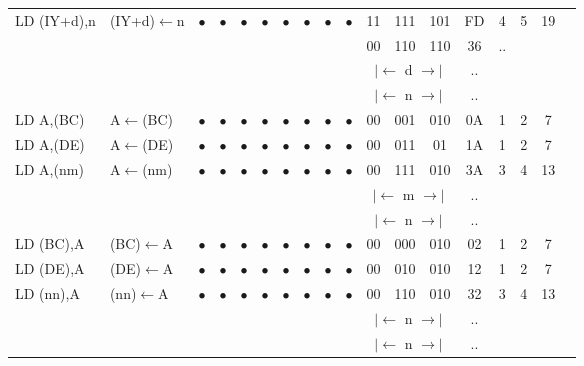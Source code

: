 \documentclass[oneside,a4paper]{book}
\newcommand{\instrt}{\rule{0pt}{2.7ex}}
\newcommand{\instrb}{\rule[-1.7ex]{0pt}{0pt}}
\begin{document}
{\begin{tabular}{llcccccccccccccccl}
		LD (IY+d),n\instrt & 
			(IY+d)$\leftarrow$n & 
			$\bullet$ & 
				$\bullet$ & 
				$\bullet$ & 
				$\bullet$ & 
				$\bullet$ & 
				$\bullet$ & 
				$\bullet$ & 
				$\bullet$ & 
			11 & 111 & 101 & 
			FD & 4 & 
			5 & 19 & \\
		\multicolumn{10}{c}{} & 00 & 110 & 110 & 36 & .. & & & \\
		\multicolumn{10}{c}{} & \multicolumn{3}{c}{$|\longleftarrow$ d $\longrightarrow|$} & .. & & & \\
		\multicolumn{10}{c}{} & \multicolumn{3}{c}{$|\longleftarrow$ n $\longrightarrow|$} & .. & & & \instrb \\

		LD A,(BC)\instrt & 
			A$\leftarrow$(BC) & 
			$\bullet$ & 
				$\bullet$ & 
				$\bullet$ & 
				$\bullet$ & 
				$\bullet$ & 
				$\bullet$ & 
				$\bullet$ & 
				$\bullet$ & 
			00 & 001 & 010 & 
			0A & 1 & 
			2 & 7 & \instrb \\

		LD A,(DE)\instrt & 
			A$\leftarrow$(DE) & 
			$\bullet$ & 
				$\bullet$ & 
				$\bullet$ & 
				$\bullet$ & 
				$\bullet$ & 
				$\bullet$ & 
				$\bullet$ & 
				$\bullet$ & 
			00 & 011 & 01 & 
			1A & 1 & 
			2 & 7 & \instrb \\

		LD A,(nm)\instrt & 
			A$\leftarrow$(nm) & 
			$\bullet$ & 
				$\bullet$ & 
				$\bullet$ & 
				$\bullet$ & 
				$\bullet$ & 
				$\bullet$ & 
				$\bullet$ & 
				$\bullet$ & 
			00 & 111 & 010 & 
			3A & 3 & 
			4 & 13 & \\
		\multicolumn{10}{c}{} & \multicolumn{3}{c}{$|\longleftarrow$ m $\longrightarrow|$} & .. & & & \\
		\multicolumn{10}{c}{} & \multicolumn{3}{c}{$|\longleftarrow$ n $\longrightarrow|$} & .. & & & \instrb \\
		
		LD (BC),A\instrt & 
			(BC)$\leftarrow$A & 
			$\bullet$ & 
				$\bullet$ & 
				$\bullet$ & 
				$\bullet$ & 
				$\bullet$ &
				$\bullet$ & 
				$\bullet$ & 
				$\bullet$ & 
			00 & 000 & 010 & 
			02 & 1 & 
			2 & 7 & \instrb \\

		LD (DE),A\instrt & 
			(DE)$\leftarrow$A & 
			$\bullet$ & 
				$\bullet$ & 
				$\bullet$ & 
				$\bullet$ & 
				$\bullet$ & 
				$\bullet$ & 
				$\bullet$ & 
				$\bullet$ & 
			00 & 010 & 010 & 
			12 & 1 & 
			2 & 7 & \instrb \\

		LD (nn),A\instrt & 
			(nn)$\leftarrow$A & 
			$\bullet$ & 
				$\bullet$ & 
				$\bullet$ & 
				$\bullet$ & 
				$\bullet$ & 
				$\bullet$ & 
				$\bullet$ & 
				$\bullet$ & 
			00 & 110 & 010 & 
			32 & 3 & 
			4 & 13 & \\
		\multicolumn{10}{c}{} & \multicolumn{3}{c}{$|\longleftarrow$ n $\longrightarrow|$} & .. & & & \\
		\multicolumn{10}{c}{} & \multicolumn{3}{c}{$|\longleftarrow$ n $\longrightarrow|$} & .. & & & \instrb \\


\end{tabular}}
\end{document}
